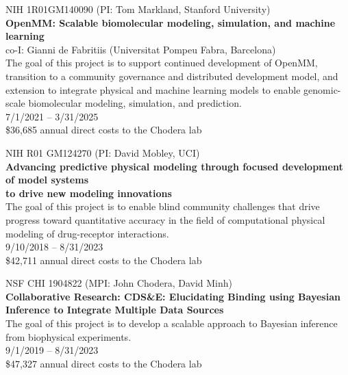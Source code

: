 \documentclass[10pt]{article}
\begin{document}
\vspace{1.5ex}

NIH 1R01GM140090 (PI: Tom Markland, Stanford University)\\
{\bf OpenMM: Scalable biomolecular modeling, simulation, and machine learning}\\
co-I: Gianni de Fabritiis (Universitat Pompeu Fabra, Barcelona)\\
The goal of this project is to support continued development of OpenMM, transition to a community governance and distributed development model, and extension to integrate physical and machine learning models to enable genomic-scale biomolecular modeling, simulation, and prediction.\\
7/1/2021 -- 3/31/2025\\
\$36,685 annual direct costs to the Chodera lab

\vspace{1.5ex}

NIH R01 GM124270 (PI: David Mobley, UCI) \\
{\bf Advancing predictive physical modeling through focused development of model systems\\ to drive new modeling innovations}\\
The goal of this project is to enable blind community challenges that drive progress toward quantitative accuracy in the field of computational physical modeling of drug-receptor interactions.\\
9/10/2018 -- 8/31/2023\\
\$42,711 annual direct costs to the Chodera lab

\vspace{1.5ex}

NSF CHI 1904822 (MPI: John Chodera, David Minh) \\
{\bf Collaborative Research: CDS\&E: Elucidating Binding using Bayesian Inference to Integrate Multiple Data Sources}\\
The goal of this project is to develop a scalable approach to Bayesian inference from biophysical experiments.\\
9/1/2019 -- 8/31/2023\\
\$47,327 annual direct costs to the Chodera lab

\vspace{1.5ex}
\end{document}
